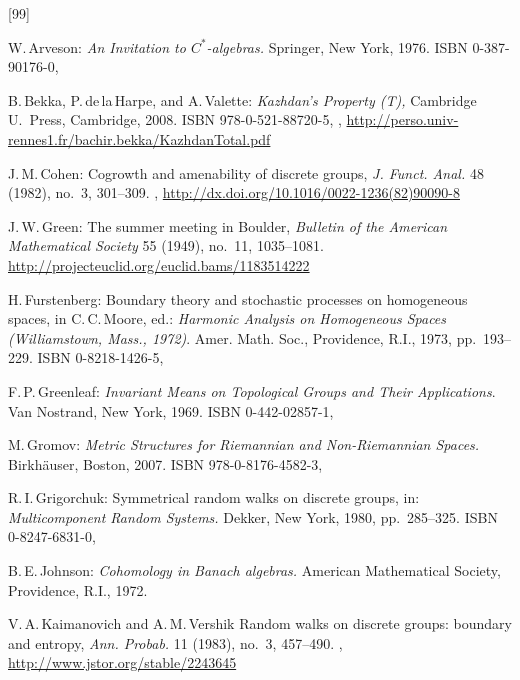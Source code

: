 \begin{references}{[99]}

W.\,Arveson:
\emph{An Invitation to $C^*$-algebras.} 
Springer, New York, 1976.
ISBN 0-387-90176-0,

B.\,Bekka, P.\,de\,la\,Harpe, and A.\,Valette:
\emph{Kazhdan's Property (T),}
Cambridge U.\ Press, Cambridge, 2008.
ISBN 978-0-521-88720-5,
,
\maynewline
\url{http://perso.univ-rennes1.fr/bachir.bekka/KazhdanTotal.pdf}

J.\,M.\,Cohen:
Cogrowth and amenability of discrete groups,
\emph{J. Funct. Anal.} 48 (1982), no.~3, 301--309. 
,
\url{http://dx.doi.org/10.1016/0022-1236(82)90090-8}

J.\,W.\,Green:
 The summer meeting in Boulder,
 \emph{Bulletin of the American Mathematical Society} 55 (1949), no.~11, 1035--1081. 
 \maynewline
 \url{http://projecteuclid.org/euclid.bams/1183514222}

H.\,Furstenberg:
Boundary theory and stochastic processes on homogeneous spaces, in
C.\,C.\,Moore, ed.:
\emph{Harmonic Analysis on Homogeneous Spaces 
(Williamstown, Mass., 1972)}. 
Amer. Math. Soc., Providence, R.I., 1973,
pp.~193--229.
ISBN 0-8218-1426-5,

F.\,P.\,Greenleaf:
\emph{Invariant Means on Topological Groups and Their Applications}.
Van Nostrand, New York, 1969.
ISBN 0-442-02857-1,

M.\,Gromov:
\emph{Metric Structures for Riemannian and Non-Riemannian Spaces.}
Birkh\"auser, Boston, 2007. 
ISBN 978-0-8176-4582-3,

R.\,I.\,Grigorchuk:
Symmetrical random walks on discrete groups,
in: 
\emph{Multicomponent Random Systems.}
Dekker, New York, 1980, pp.~285--325.
ISBN 0-8247-6831-0,

B.\,E.\,Johnson:
\emph{Cohomology in Banach algebras.}
American Mathematical Society, Providence, R.I., 1972.

 V.\,A.\,Kaimanovich and A.\,M.\,Vershik
 Random walks on discrete groups: boundary and entropy,
 \emph{Ann. Probab.} 11 (1983), no.~3, 457--490.
 ,
 \maynewline
 \url{http://www.jstor.org/stable/2243645}


\end{references}
